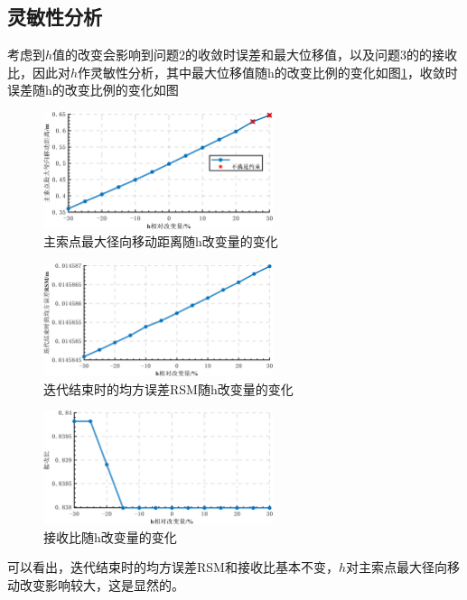 \documentclass[withoutpreface,bwprint]{cumcmthesis} %
\begin{document}
	\subsection{灵敏性分析}
	考虑到$h$值的改变会影响到问题2的收敛时误差和最大位移值，以及问题3的的接收比，因此对$h$作灵敏性分析，其中最大位移值随h的改变比例的变化如图\ref{主索点最大径向移动距离随h改变量的变化}，收敛时误差随h的改变比例的变化如图
	\begin{figure}[H]
		\centering
		\includegraphics[width=0.6\textwidth]{主索点最大径向移动距离随h改变量的变化}
		\caption{主索点最大径向移动距离随h改变量的变化}
		\label{主索点最大径向移动距离随h改变量的变化}
	\end{figure}
	\begin{figure}[H]
		\centering
		\includegraphics[width=0.6\textwidth]{迭代结束时的均方误差RSM随h改变量的变化}
		\caption{迭代结束时的均方误差RSM随h改变量的变化}
		\label{迭代结束时的均方误差RSM随h改变量的变化}
	\end{figure}
	\begin{figure}[H]
		\centering
		\includegraphics[width=0.6\textwidth]{接收比随h改变量的变化}
		\caption{接收比随h改变量的变化}
		\label{接收比随h改变量的变化}
	\end{figure}
	可以看出，迭代结束时的均方误差RSM和接收比基本不变，$h$对主索点最大径向移动改变影响较大，这是显然的。
\end{document}
